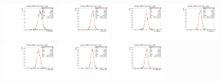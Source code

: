 \begin{figure}[htbp]\centering
    \includegraphics[width=0.24\textwidth]{figure/app_ff/dataset_4600_fit_frac_res0_x_res0.pdf}
    \includegraphics[width=0.24\textwidth]{figure/app_ff/dataset_4600_fit_frac_res1_x_res0.pdf}
    \includegraphics[width=0.24\textwidth]{figure/app_ff/dataset_4600_fit_frac_res2_x_res0.pdf}
    \includegraphics[width=0.24\textwidth]{figure/app_ff/dataset_4600_fit_frac_res3_x_res0.pdf}\\
    \includegraphics[width=0.24\textwidth]{figure/app_ff/dataset_4600_fit_frac_res4_x_res0.pdf}
    \includegraphics[width=0.24\textwidth]{figure/app_ff/dataset_4600_fit_frac_res5_x_res0.pdf}
    \includegraphics[width=0.24\textwidth]{figure/app_ff/dataset_4600_fit_frac_res6_x_res0.pdf}

\end{figure}
